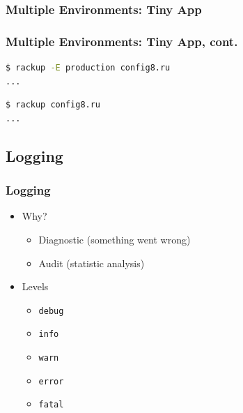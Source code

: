 \documentclass{beamer}
\begin{document}
\begin{frame}[fragile]\frametitle{Multiple Environments: Tiny App} 

  
  
  

\end{frame}






\begin{frame}[fragile]\frametitle{Multiple Environments: Tiny App, cont.} 

  

  \begin{lstlisting}[language=bash, escapechar={^}]
$ rackup -E production config8.ru
...
  \end{lstlisting}
  
  \begin{lstlisting}[language=bash, escapechar={^}]
$ rackup config8.ru
...
  \end{lstlisting}
  
\end{frame}






\subsection{Logging} 
\begin{frame}\frametitle{Logging}
 
  \begin{itemize}
  
    \item Why?
    \begin{itemize}
      \item Diagnostic (something went wrong)
      \item Audit (statistic analysis)
    \end{itemize}

    \item Levels
    \begin{itemize}
      \item \texttt{debug}
      \item \texttt{info}
      \item \texttt{warn}
      \item \texttt{error}
      \item \texttt{fatal}
    \end{itemize}

  \end{itemize}

\end{frame}
\end{document}
